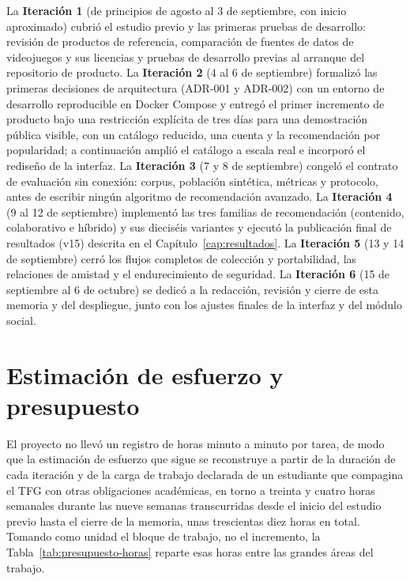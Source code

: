 La \textbf{Iteración 1} (de principios de agosto al 3 de septiembre, con inicio aproximado) cubrió el
estudio previo y las primeras pruebas de desarrollo: revisión de productos de referencia,
comparación de fuentes de datos de videojuegos y sus licencias y pruebas de desarrollo
previas al arranque del repositorio de producto. La \textbf{Iteración 2} (4 al 6 de septiembre)
formalizó las primeras decisiones de arquitectura (ADR-001 y ADR-002) con un entorno de
desarrollo reproducible en Docker Compose y entregó el primer incremento de producto bajo una
restricción explícita de tres días para una demostración pública visible, con un catálogo
reducido, una cuenta y la recomendación por popularidad; a continuación amplió el catálogo a
escala real e incorporó el rediseño de la interfaz. La \textbf{Iteración 3} (7 y 8 de
septiembre) congeló el contrato de evaluación sin conexión: corpus, población sintética, métricas y
protocolo, antes de escribir ningún algoritmo de recomendación avanzado. La
\textbf{Iteración 4} (9 al 12 de septiembre) implementó las tres familias de recomendación
(contenido, colaborativo e híbrido) y sus dieciséis variantes y ejecutó la publicación final de
resultados (v15) descrita en el Capítulo~\ref{cap:resultados}. La \textbf{Iteración 5} (13 y 14
de septiembre) cerró los flujos completos de colección y portabilidad, las relaciones de
amistad y el endurecimiento de seguridad. La \textbf{Iteración 6} (15 de septiembre al 6 de
octubre) se dedicó a la redacción, revisión y cierre de esta memoria y del despliegue, junto con
los ajustes finales de la interfaz y del módulo social.

\section{Estimación de esfuerzo y presupuesto}\label{sec:met-presupuesto}

El proyecto no llevó un registro de horas minuto a minuto por tarea, de modo que la estimación
de esfuerzo que sigue se reconstruye a partir de la duración de cada iteración y de la carga de
trabajo declarada de un estudiante que compagina el TFG con otras obligaciones académicas,
en torno a treinta y cuatro horas semanales durante las nueve semanas transcurridas desde el inicio
del estudio previo hasta el cierre de la memoria, unas trescientas diez horas en total. Tomando
como unidad el bloque de trabajo, no el incremento, la Tabla~\ref{tab:presupuesto-horas}
reparte esas horas entre las grandes áreas del trabajo.

